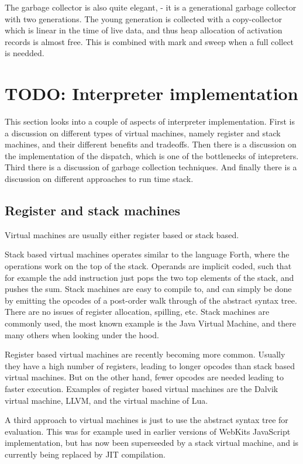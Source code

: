 The garbage collector is also quite elegant, - it is a generational garbage collector with two generations. The young generation is collected with a copy-collector which is linear in the time of live data, and thus heap allocation of activation records is almost free. 
This is combined with mark and sweep when a full collect is needded.


\section{TODO: Interpreter implementation}
\label{interpreter-implementation}
This section looks into a couple of aspects of interpreter implementation.
First is a discussion on different types of virtual machines, namely register and stack machines, and their different benefits and tradeoffs.
Then there is a discussion on the implementation of the dispatch, which is one of the bottlenecks of intepreters.
Third there is a discussion of garbage collection techniques.
And finally there is a discussion on different approaches to run time stack.

\subsection{Register and stack machines}
Virtual machines are usually either register based or stack based.

Stack based virtual machines operates similar to the language Forth, where the operations work on the top of the stack. 
Operands are implicit coded, such that for example the add instruction just pops the two top elements of the stack, and pushes the sum. 
Stack machines are easy to compile to, 
and can simply be done by emitting the opcodes of a post-order walk through of the abstract syntax tree. 
There are no issues of register allocation, spilling, etc.
Stack machines are commonly used, the most known example is the Java Virtual Machine, and there many others when looking under the hood.

Register based virtual machines are recently becoming more common. 
Usually they have a high number of registers, leading to longer opcodes than stack based virtual machines. But on the other hand, fewer opcodes are needed leading to faster execution\cite{register-vs-stack}. 
Examples of register based virtual machines are the Dalvik\cite{dalvik} virtual machine, LLVM\cite{llvm}, and the virtual machine of Lua\cite{luavm}.

A third approach to virtual machines is just to use the abstract syntax tree for evaluation. This was for example used in earlier versions of WebKits JavaScript implementation, but has now been superseeded by a stack virtual machine, and is currently being replaced by JIT compilation.

